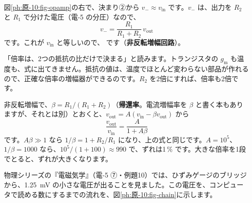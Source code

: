 図\ref{ph:原-10:fig-opamp}の右で、決まり②から $v_-\approx v_{\mathrm{in}}$ です。$v_-$ は、出力を $R_2$ と $R_1$ で分けた電圧（電-5 の分圧）なので、
\[ v_-=\frac{R_1}{R_1+R_2}\,v_{\mathrm{out}} \]
です。これが $v_{\mathrm{in}}$ と等しいので、
\label{ph:原-10:noninv}です（\textbf{非反転増幅回路}）。

\begin{phflow}[キルヒホッフから増幅の倍率へ]
\end{phflow}

\begin{phyomi}[$v_{\mathrm{out}}=-(R_2/R_1)v_{\mathrm{in}}$]
「倍率は、2つの抵抗の比だけで決まる」と読みます。トランジスタの $g_{\mathrm m}$ も温度も、式に出てきません。抵抗の値は、温度でほとんど変わらない部品が作れるので、正確な倍率の増幅器ができるのです。$R_2$ を2倍にすれば、倍率も2倍です。
\end{phyomi}

非反転増幅で、$\beta=R_1/(R_1+R_2)$（\textbf{帰還率}。電流増幅率を $\beta$ と書く本もありますが、それとは別）とおくと、$v_{\mathrm{out}}=A(v_{\mathrm{in}}-\beta v_{\mathrm{out}})$ から
\[ \frac{v_{\mathrm{out}}}{v_{\mathrm{in}}}=\frac{A}{1+A\beta} \]
です。$A\beta\gg1$ なら $1/\beta=1+R_2/R_1$ になり、上の式と同じです。$A=10^5$、$1/\beta=1000$ なら、$10^5/(1+100)\approx990$ で、ずれは1\,\% です。大きな倍率を1段でとると、ずれが大きくなります。

\begin{phmodel}[理想オペアンプ]
\end{phmodel}

\label{ph:原-10:sec9}
物理シリーズの『電磁気学』（電-5 ⑦・例題10）では、ひずみゲージのブリッジから、\qty{1.25}{mV} の小さな電圧が出ることを見ました。この電圧を、コンピュータで読める数にするまでの流れを、図\ref{ph:原-10:fig-chain}に示します。

